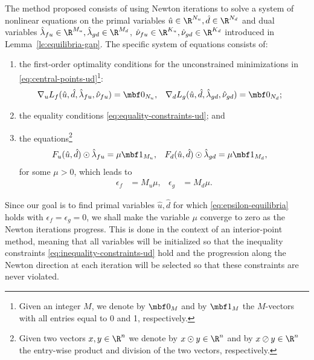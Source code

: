 \documentclass[11pt]{article}
\begin{document}
The method proposed consists of using Newton iterations to solve a
system of nonlinear equations on the primal variables $\hat
u\in\R^{N_u},\hat d\in\R^{N_d}$ and dual variables
$\hat\lambda_{fu}\in\R^{M_u},\hat\lambda_{gd}\in\R^{M_d}$,
$\hat\nu_{fu}\in\R^{K_u},\hat\nu_{gd}\in\R^{K_d}$ introduced in
Lemma~\ref{le:equilibria-gap}. The specific system of equations
consists of:
\begin{enumerate}
\item the first-order optimality conditions for the unconstrained
  minimizations in \eqref{eq:central-points-ud}\footnote{Given an integer
    $M$, we denote by $\mbf 0_M$ and by $\mbf 1_M$ the $M$-vectors
    with all entries equal to 0 and 1, respectively.}:
  \begin{align}\label{eq:equilibrium}
    \nabla_u L_f(\hat u,\hat d,\hat\lambda_{fu},\hat\nu_{fu})&=\mbf 0_{N_u}, &
    \nabla_d L_g(\hat u,\hat d,\hat\lambda_{gd},\hat\nu_{gd})&=\mbf 0_{N_d}; &
  \end{align}
\item the equality conditions \eqref{eq:equality-constraints-ud}; and
\item the equations\footnote{Given two vectors $x,y\in\R^n$ we denote by
    $x\odot y\in\R^n$ and by $x\oslash y\in\R^n$ the entry-wise product and
    division of the two vectors, respectively.}
  \begin{align}\label{eq:barrier-ud}
    F_u(\hat u,\hat d)\odot\hat\lambda_{fu}&=\mu\mbf 1_{M_u}, &
    F_d(\hat u,\hat d)\odot\hat\lambda_{gd}&=\mu\mbf 1_{M_d}, &
  \end{align}
  for some $\mu>0$, which leads to
  \begin{align*}
    \epsilon_f&=M_u \mu, & \epsilon_g&=M_d \mu.
  \end{align*}
\end{enumerate}
Since our goal is to find primal variables $\hat u,\hat d$ for which
\eqref{eq:epsilon-equilibria} holds with $\epsilon_f=\epsilon_g=0$, we shall make
the variable $\mu$ converge to zero as the Newton iterations
progress. This is done in the context of an interior-point method,
meaning that all variables will be initialized so that the inequality
constraints \eqref{eq:inequality-constraints-ud} hold and the progression
along the Newton direction at each iteration will be selected so that
these constraints are never violated.

\medskip
\end{document}
